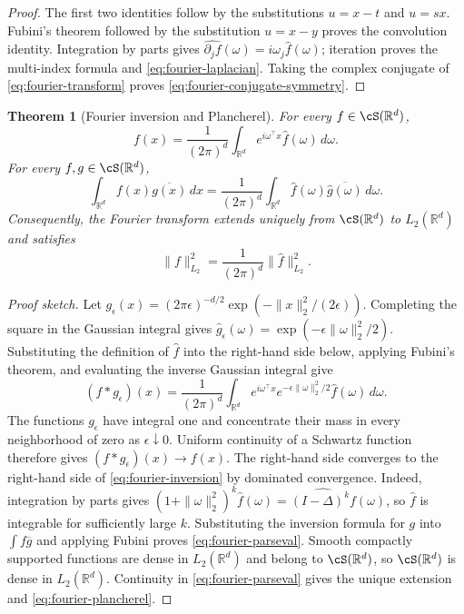 \documentclass[11pt,twoside]{article}
\newcommand{\R}{\mathbb R}
\newtheorem{theorem}{Theorem}[section]
\theoremstyle{definition}
\theoremstyle{remark}
\begin{document}
\begin{proof}
The first two identities follow by the substitutions $u=x-t$ and $u=sx$.
Fubini's theorem followed by the substitution $u=x-y$ proves the convolution
identity. Integration by parts gives
$\widehat{\partial_jf}(\omega)=i\omega_j\widehat f(\omega)$; iteration proves
the multi-index formula and \cref{eq:fourier-laplacian}. Taking the complex
conjugate of \cref{eq:fourier-transform} proves
\cref{eq:fourier-conjugate-symmetry}.
\end{proof}

\begin{theorem}[Fourier inversion and Plancherel]
\label{thm:fourier-inversion-plancherel}
For every $f\in\cS(\R^d)$,
\begin{equation}
 f(x)=\frac{1}{(2\pi)^d}\int_{\R^d}
 e^{i\omega^\top x}\widehat f(\omega)\,d\omega.
 \label{eq:fourier-inversion}
\end{equation}
For every $f,g\in\cS(\R^d)$,
\begin{equation}
 \int_{\R^d}f(x)\overline{g(x)}\,dx
 =\frac{1}{(2\pi)^d}\int_{\R^d}
 \widehat f(\omega)\overline{\widehat g(\omega)}\,d\omega.
 \label{eq:fourier-parseval}
\end{equation}
Consequently, the Fourier transform extends uniquely from
$\cS(\R^d)$ to $L_2(\R^d)$ and satisfies
\begin{equation}
 \|f\|_{L_2}^2
 =\frac{1}{(2\pi)^d}\|\widehat f\|_{L_2}^2.
 \label{eq:fourier-plancherel}
\end{equation}
\end{theorem}

\begin{proof}[Proof sketch]
Let
$g_\epsilon(x)=(2\pi\epsilon)^{-d/2}
\exp(-\|x\|_2^2/(2\epsilon))$. Completing the square in the Gaussian
integral gives
$\widehat g_\epsilon(\omega)=
\exp(-\epsilon\|\omega\|_2^2/2)$. Substituting the definition of
$\widehat f$ into the right-hand side below, applying Fubini's theorem, and
evaluating the inverse Gaussian integral give
\begin{equation}
 (f*g_\epsilon)(x)
 =\frac{1}{(2\pi)^d}\int_{\R^d}e^{i\omega^\top x}
 e^{-\epsilon\|\omega\|_2^2/2}\widehat f(\omega)\,d\omega.
 \label{eq:gaussian-regularized-inversion}
\end{equation}
The functions $g_\epsilon$ have integral one and concentrate their mass in
every neighborhood of zero as $\epsilon\downarrow0$. Uniform continuity of a
Schwartz function therefore gives
$(f*g_\epsilon)(x)\to f(x)$. The right-hand side converges to
the right-hand side of \cref{eq:fourier-inversion} by dominated convergence.
Indeed, integration by parts gives
$(1+\|\omega\|_2^2)^k\widehat f(\omega)
=\widehat{(I-\Delta)^kf}(\omega)$, so $\widehat f$ is integrable for
sufficiently large $k$. Substituting the inversion formula for $g$ into
$\int f\overline g$ and applying Fubini proves
\cref{eq:fourier-parseval}. Smooth compactly supported functions are dense in
$L_2(\R^d)$ and belong to $\cS(\R^d)$, so $\cS(\R^d)$ is dense in
$L_2(\R^d)$. Continuity in \cref{eq:fourier-parseval} gives the unique extension and
\cref{eq:fourier-plancherel}.
\end{proof}
\end{document}
